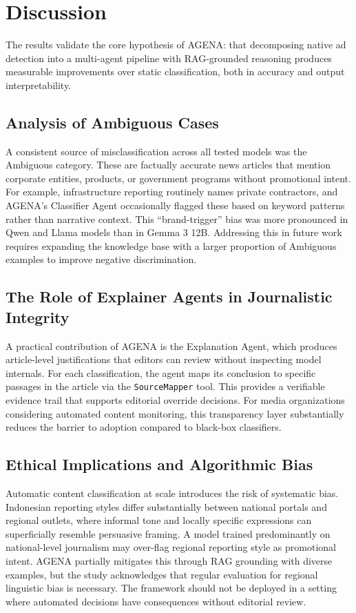 \documentclass{ieeeaccess}
\begin{document}
\section{Discussion}
\label{sec:discussion}
The results validate the core hypothesis of AGENA: that decomposing native ad detection into a multi-agent pipeline with RAG-grounded reasoning produces measurable improvements over static classification, both in accuracy and output interpretability.

\subsection{Analysis of Ambiguous Cases}
A consistent source of misclassification across all tested models was the Ambiguous category. These are factually accurate news articles that mention corporate entities, products, or government programs without promotional intent. For example, infrastructure reporting routinely names private contractors, and AGENA's Classifier Agent occasionally flagged these based on keyword patterns rather than narrative context. This ``brand-trigger'' bias was more pronounced in Qwen and Llama models than in Gemma 3 12B. Addressing this in future work requires expanding the knowledge base with a larger proportion of Ambiguous examples to improve negative discrimination.

\subsection{The Role of Explainer Agents in Journalistic Integrity}
A practical contribution of AGENA is the Explanation Agent, which produces article-level justifications that editors can review without inspecting model internals. For each classification, the agent maps its conclusion to specific passages in the article via the \texttt{Source\allowbreak Mapper} tool. This provides a verifiable evidence trail that supports editorial override decisions. For media organizations considering automated content monitoring, this transparency layer substantially reduces the barrier to adoption compared to black-box classifiers.

\subsection{Ethical Implications and Algorithmic Bias}
Automatic content classification at scale introduces the risk of systematic bias. Indonesian reporting styles differ substantially between national portals and regional outlets, where informal tone and locally specific expressions can superficially resemble persuasive framing. A model trained predominantly on national-level journalism may over-flag regional reporting style as promotional intent. AGENA partially mitigates this through RAG grounding with diverse examples, but the study acknowledges that regular evaluation for regional linguistic bias is necessary. The framework should not be deployed in a setting where automated decisions have consequences without editorial review.
\end{document}

